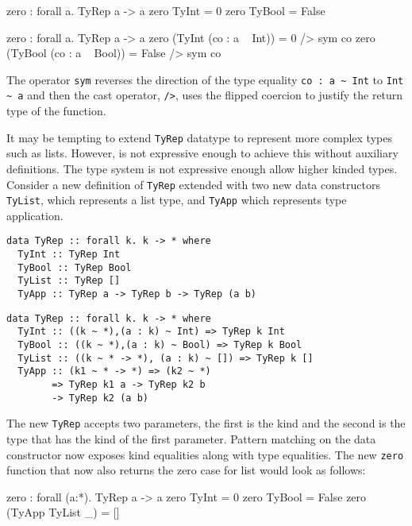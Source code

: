 \documentclass[manuscript,screen,nonacm]{acmart}
\begin{document}
\begin{minipage}{0.5\linewidth}
 \begin{codef}
 zero : forall a. TyRep a -> a
 zero TyInt = 0
 zero TyBool = False
 \end{codef}
\end{minipage}%
\begin{minipage}{0.5\linewidth}
 \begin{codef}
 zero : forall a. TyRep a -> a
 zero (TyInt (co : a ~ Int)) = 0 /> sym co
 zero (TyBool (co : a ~ Bool)) = False /> sym co
 \end{codef}
\end{minipage}

The operator \lstinline|sym| reverses the direction of the type equality \lstinline|co : a ~ Int| to \lstinline|Int ~ a| and then the cast operator, \lstinline{/>}, uses the flipped coercion to justify the return type of the function.

It may be tempting to extend \lstinline{TyRep} datatype to represent more complex types such as lists. However, \SFC is not expressive enough to achieve this without auxiliary definitions. The type system is not expressive enough allow higher kinded types. Consider a new definition of \lstinline{TyRep} extended with two new data constructors \lstinline{TyList}, which represents a list type, and \lstinline{TyApp} which represents type application.

\begin{minipage}[ht]{0.4\linewidth}
\begin{lstlisting}
data TyRep :: forall k. k -> * where
  TyInt :: TyRep Int
  TyBool :: TyRep Bool
  TyList :: TyRep []
  TyApp :: TyRep a -> TyRep b -> TyRep (a b)
 \end{lstlisting}
\end{minipage}%
\begin{minipage}[ht]{0.5\linewidth}
\begin{lstlisting}
data TyRep :: forall k. k -> * where
  TyInt :: ((k ~ *),(a : k) ~ Int) => TyRep k Int
  TyBool :: ((k ~ *),(a : k) ~ Bool) => TyRep k Bool
  TyList :: ((k ~ * -> *), (a : k) ~ []) => TyRep k []
  TyApp :: (k1 ~ * -> *) => (k2 ~ *)
        => TyRep k1 a -> TyRep k2 b
        -> TyRep k2 (a b)
\end{lstlisting}
\end{minipage}

The new \lstinline{TyRep} accepts two parameters, the first is the kind and the second is the type that has the kind of the first parameter. Pattern matching on the data constructor now exposes kind equalities along with type equalities. The new \lstinline{zero} function that now also returns the zero case for list would look as follows:
\begin{codef}
 zero : forall (a:*). TyRep a -> a
 zero TyInt = 0
 zero TyBool = False
 zero (TyApp TyList _) = []
\end{codef}
\end{document}
